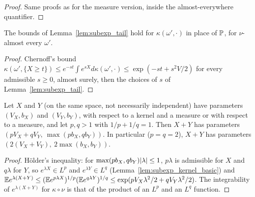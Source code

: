 \begin{proof}
\leanok
{}
Same proofs as for the measure version, inside the almost-everywhere quantifier.
\end{proof}

\begin{lemma}\label{lem:subexp_kernel_tail}
\leanok
{}
The bounds of Lemma~\ref{lem:subexp_tail} hold for $\kappa(\omega',\cdot)$ in place of
$\mathbb{P}$, for $\nu$-almost every $\omega'$.
\end{lemma}

\begin{proof}
\leanok
{}
Chernoff's bound $\kappa(\omega',\{X\ge t\}) \le e^{-st}\int e^{sX}d\kappa(\omega',\cdot)
\le \exp(-st + s^2V/2)$ for every admissible $s \ge 0$, almost surely, then the choices of
$s$ of Lemma~\ref{lem:subexp_tail}.
\end{proof}

\begin{lemma}\label{lem:subexp_add_holder}
\leanok
{}
Let $X$ and $Y$ (on the same space, not necessarily independent) have parameters $(V_X, b_X)$
and $(V_Y, b_Y)$, with respect to a kernel and a measure or with respect to a measure, and
let $p, q > 1$ with $1/p + 1/q = 1$. Then $X + Y$ has parameters
$(pV_X + qV_Y,\ \max(pb_X, qb_Y))$. In particular ($p = q = 2$), $X+Y$ has parameters
$(2(V_X + V_Y),\ 2\max(b_X, b_Y))$.
\end{lemma}

\begin{proof}
\leanok
{}
Hölder's inequality: for $\max(pb_X, qb_Y)\lvert \lambda \rvert \le 1$, $p\lambda$ is admissible for
$X$ and $q\lambda$ for $Y$, so $e^{\lambda X}\in L^p$ and $e^{\lambda Y} \in L^q$
(Lemma~\ref{lem:subexp_kernel_basic}) and
$\mathbb{E} e^{\lambda(X+Y)} \le (\mathbb{E} e^{p\lambda X})^{1/p}(\mathbb{E} e^{q\lambda Y})^{1/q}
\le \exp(pV_X\lambda^2/2 + qV_Y\lambda^2/2)$. The integrability of $e^{\lambda(X+Y)}$ for
$\kappa\circ\nu$ is that of the product of an $L^p$ and an $L^q$ function.
\end{proof}

